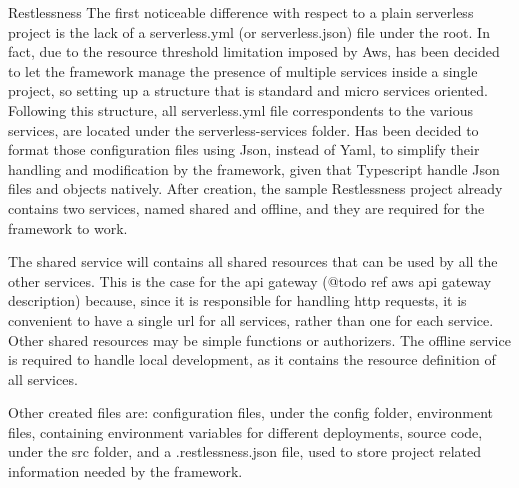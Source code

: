 \begin{chapter}{Restlessness}
    The first noticeable difference with respect to a plain serverless project is the
    lack of a serverless.yml (or serverless.json) file under the root.
    In fact, due to the resource threshold limitation imposed by Aws, has been decided
    to let the framework manage the presence of multiple services inside a single
    project, so setting up a structure that is standard and micro services oriented.
    Following this structure, all serverless.yml file correspondents to the various
    services, are located under the serverless-services folder.
    Has been decided to format those configuration files using Json, instead of Yaml,
    to simplify their handling and modification by the framework, given that Typescript
    handle Json files and objects natively.
    After creation, the sample Restlessness project already contains two services,
    named shared and offline, and they are required for the framework to work.

    The shared service will contains all shared resources that can be used by all
    the other services. This is the case for the api gateway (@todo ref aws api
    gateway description) because, since it is responsible for handling http requests,
    it is convenient to have a single url for all services, rather than one for
    each service. Other shared resources may be simple functions or authorizers.
    The offline service is required to handle local development, as it contains the
    resource definition of all services.

    Other created files are: configuration files, under the config folder, environment
    files, containing environment variables for different deployments, source code,
    under the src folder, and a .restlessness.json file, used to store project related
    information needed by the framework.


\end{chapter}
